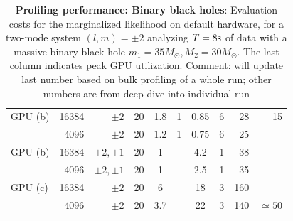 \documentclass[twocolumn,prd,nofootinbib]{revtex4}
\newcommand\unit[1]{{\rm #1}}
\newcommand\editremark[1]{{\color{red} #1}}
\begin{document}
\begin{table}
\begin{tabular}{lrr|ccccc|rr}
GPU (b) & 16384 & $\pm 2$ & 20  & 1.8 & 1 & \editremark{0.85}& \editremark{6} &28 & 15\\
       & 4096 & $\pm 2$  & 20 & $1.2 $ &  1  & \editremark{0.75} & \editremark{6}  & 25\\ \hline
GPU (b) & 16384 & $\pm 2, \pm 1$ & 20 & 1 && 4.2 & \editremark{1}  & 38  \\
       & 4096 & $\pm 2, \pm 1$ & 20 & 1&& 2.5  & \editremark{1} & 35 & \\ \hline
%
GPU (c) & 16384 & $\pm 2 $  & 20  &6  & & 18& 3 &160 &  \\
            & 4096 &$\pm 2 $  &  20 & 3.7 & & 22  & 3 & 140 & $\simeq 50$ \\
\end{tabular}
\caption{\label{tab:CostBreakdown}\textbf{Profiling performance: Binary black holes}: Evaluation costs for the
  marginalized likelihood on default
  hardware, for a two-mode system $(l,m)=\pm 2$ analyzing $T=8\unit{s}$ of data with a massive binary black hole
  $m_1=35 M_\odot,M_2=30 M_\odot$.  The last column indicates peak GPU utilization.
\editremark{Comment: will update last number based on bulk profiling of a whole run; other numbers are from deep dive into individual run}
}
\end{table}
\end{document}
